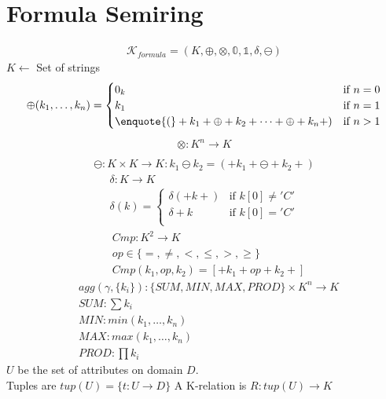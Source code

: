\documentclass{article}
\newcommand{\dq}[1]{\text{\enquote{#1}}}
\begin{document}
\section{Formula Semiring}
\begin{align*}
  \mathcal{K}_{formula} = (K, \oplus, \otimes, \mathbb{0}, \mathbb{1}, \delta, \ominus)
\end{align*}
$K \leftarrow$ Set of strings\\
\begin{align*}
\oplus (k_1,\dots, k_n) = \begin{cases}
    0_k & \text{if } n = 0\\
    k_1 & \text{if } n = 1\\
    \dq{(}+k_1 + \oplus + k_2 + \dots + \oplus + k_n +) & \text{if } n > 1  
\end{cases}
\end{align*}
\begin{align*}
  \otimes: K^n \rightarrow K \\
\end{align*}
\begin{align*}
  \ominus: K\times K \rightarrow K: k_1 \ominus k_2 = (+k_1+ \ominus +k_2+)
\end{align*} 
\begin{align*}
\delta: K \rightarrow K\\
\delta(k) = \begin{cases}
    \delta(+k+) & \text{if } k[0] \neq 'C'\\
    \delta +k & \text{if } k[0] = 'C'\\
    \end{cases}
\end{align*}
\begin{align*}
  &Cmp: K^2 \rightarrow K\\
  &op\in\{=,\neq, <, \leq, >, \geq\}\\
  &Cmp(k_1, op, k_2) = [+k_1 + op + k_2 +]
\end{align*}
\begin{align*}
&agg(\gamma, \{k_i\}): \{SUM, MIN, MAX, PROD\}\times K^n \rightarrow K\\
&SUM: \sum k_i\\
&MIN: min(k_1, \dots, k_n)\\
&MAX: max(k_1, \dots, k_n)\\
&PROD: \prod k_i
\end{align*}
$U$ be the set of attributes on domain $D$.\\
Tuples are $tup(U) = \{t: U \rightarrow D\}$
A K-relation is $R: tup(U) \rightarrow K$
\end{document}
